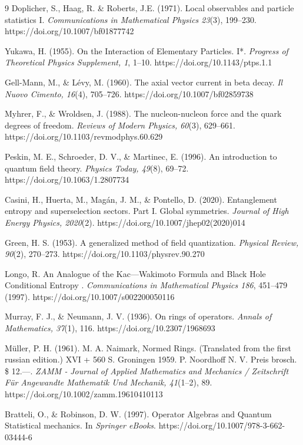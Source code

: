 \documentclass[a4paper,11pt]{article}
\begin{document}
\begin{thebibliography}{9}
Doplicher, S., Haag, R. \& Roberts, J.E. (1971). Local observables and particle statistics I. \emph{Communications in Mathematical Physics 23}(3), 199–230. https://doi.org/10.1007/bf01877742

Yukawa, H. (1955). On the Interaction of Elementary Particles. I*. \emph{Progress of Theoretical Physics Supplement, 1}, 1–10. https://doi.org/10.1143/ptps.1.1

Gell-Mann, M., \& Lévy, M. (1960). The axial vector current in beta decay. \emph{Il Nuovo Cimento, 16}(4), 705–726. https://doi.org/10.1007/bf02859738

Myhrer, F., \& Wroldsen, J. (1988). The nucleon-nucleon force and the quark degrees of freedom. \emph{Reviews of Modern Physics, 60}(3), 629–661. https://doi.org/10.1103/revmodphys.60.629

Peskin, M. E., Schroeder, D. V., \& Martinec, E. (1996). An introduction to quantum field theory. \emph{Physics Today, 49}(8), 69–72. https://doi.org/10.1063/1.2807734

Casini, H., Huerta, M., Magán, J. M., \& Pontello, D. (2020). Entanglement entropy and superselection sectors. Part I. Global symmetries. \emph{Journal of High Energy Physics, 2020}(2). https://doi.org/10.1007/jhep02(2020)014

Green, H. S. (1953). A generalized method of field quantization. \emph{Physical Review, 90}(2), 270–273. https://doi.org/10.1103/physrev.90.270

Longo, R. An Analogue of the Kac—Wakimoto Formula and Black Hole Conditional Entropy . \emph{Communications in Mathematical Physics 186}, 451–479 (1997). https://doi.org/10.1007/s002200050116

Murray, F. J., \& Neumann, J. V. (1936). On rings of operators. \emph{Annals of Mathematics, 37}(1), 116. https://doi.org/10.2307/1968693

Müller, P. H. (1961). M. A. Naimark, Normed Rings. (Translated from the first russian edition.) XVI + 560 S. Groningen 1959. P. Noordhoff N. V. Preis brosch. \$ 12.—. \emph{ZAMM ‐ Journal of Applied Mathematics and Mechanics / Zeitschrift Für Angewandte Mathematik Und Mechanik, 41}(1–2), 89. https://doi.org/10.1002/zamm.19610410113

Bratteli, O., \& Robinson, D. W. (1997). Operator Algebras and Quantum Statistical mechanics. In \emph{Springer eBooks}. https://doi.org/10.1007/978-3-662-03444-6


\end{thebibliography}
\end{document}
